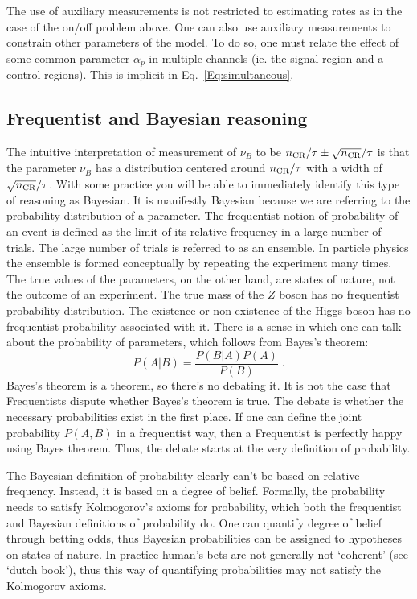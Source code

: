 The use of auxiliary measurements is not restricted to estimating rates as in the case of the on/off problem above.  One can also use auxiliary measurements to constrain other parameters of the model. To do so, one must relate the effect of some common parameter $\alpha_p$ in multiple channels (ie. the signal region and a control regions).   This is implicit in Eq.~\ref{Eq:simultaneous}.


\subsection{Frequentist and Bayesian reasoning}


The intuitive interpretation of measurement of $\nu_B$ to be $n_{\rm CR}/\tau \pm \sqrt{n_{\rm CR}}/\tau$ is that the parameter $\nu_B$ has a distribution centered around $n_{\rm CR}/\tau$ with a width of $\sqrt{n_{\rm CR}}/\tau$.  With some practice you will be able to immediately identify this type of reasoning as Bayesian.  It is manifestly Bayesian because we are referring to the probability distribution of a parameter.  The frequentist notion of probability of an event is defined as the limit of its relative frequency in a large number of trials.  The large number of trials is referred to as an ensemble.  In particle physics the ensemble is formed conceptually by repeating the experiment many times.  The true values of the parameters, on the other hand, are states of nature, not the outcome of an experiment.  The true mass of the $Z$ boson has no frequentist probability distribution.  The existence or non-existence of the Higgs boson has no frequentist probability associated with it.  There is a sense in which one can talk about the probability of parameters, which follows from Bayes's theorem:
\begin{equation}
\label{Eq:Bayes}
P(A|B) = \frac{P(B|A) P(A)}{P(B)} \; .
\end{equation}
Bayes's theorem is a theorem, so there's no debating it.  It is not the case that Frequentists dispute whether Bayes's theorem is true.  The debate is whether the necessary probabilities exist in the first place.  If one can define the joint probability $P(A,B)$ in a frequentist way, then a Frequentist is perfectly happy using Bayes theorem.   Thus, the debate starts at the very definition of probability.


The Bayesian definition of probability clearly can't be based on relative frequency.  Instead, it is based on a degree of belief.  Formally, the probability needs to satisfy Kolmogorov's axioms for probability, which both the frequentist and Bayesian definitions of probability do.  One can quantify degree of belief through betting odds, thus Bayesian probabilities can be assigned to hypotheses on states of nature.  In practice human's bets are not generally not `coherent' (see `dutch book'), thus this way of quantifying probabilities may not satisfy the Kolmogorov axioms.


